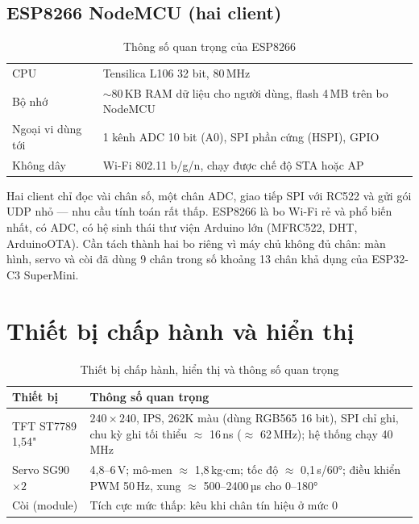 \subsection{ESP8266 NodeMCU (hai client)}
\begin{table}[H]
\centering\small
\caption{Thông số quan trọng của ESP8266}\label{tab:esp8266}
\begin{tabularx}{\linewidth}{@{}lX@{}}
\toprule
CPU & Tensilica L106 32 bit, 80\,MHz \\
Bộ nhớ & $\sim$80\,KB RAM dữ liệu cho người dùng, flash 4\,MB trên bo NodeMCU \\
Ngoại vi dùng tới & 1 kênh ADC 10 bit (A0), SPI phần cứng (HSPI), GPIO \\
Không dây & Wi-Fi 802.11 b/g/n, chạy được chế độ STA hoặc AP \\
\bottomrule
\end{tabularx}
\end{table}

\begin{lydo}
Hai client chỉ đọc vài chân số, một chân ADC, giao tiếp SPI với RC522 và gửi gói
UDP nhỏ — nhu cầu tính toán rất thấp. ESP8266 là bo Wi-Fi rẻ và phổ biến nhất, có
ADC, có hệ sinh thái thư viện Arduino lớn (MFRC522, DHT, ArduinoOTA). Cần tách thành hai
bo riêng vì máy chủ không đủ chân: màn hình, servo và còi đã dùng 9 chân trong số khoảng 13
chân khả dụng của ESP32-C3 SuperMini.
\end{lydo}

\section{Thiết bị chấp hành và hiển thị}
\begin{table}[H]
\centering\small
\caption{Thiết bị chấp hành, hiển thị và thông số quan trọng}\label{tab:actuators}
\begin{tabularx}{\linewidth}{@{}p{3.1cm}X@{}}
\toprule
\textbf{Thiết bị} & \textbf{Thông số quan trọng} \\ \midrule
TFT ST7789 1,54" & $240\times240$, IPS, 262K màu (dùng RGB565 16 bit), SPI chỉ ghi, chu kỳ ghi tối thiểu $\approx$ 16\,ns ($\approx$ 62\,MHz); hệ thống chạy 40\,MHz \\
Servo SG90 $\times2$ & 4,8–6\,V; mô-men $\approx$ 1,8\,kg$\cdot$cm; tốc độ $\approx$ 0,1\,s/60°; điều khiển PWM 50\,Hz, xung $\approx$ 500–2400\,µs cho 0–180° \\
Còi (module) & Tích cực mức thấp: kêu khi chân tín hiệu ở mức 0 \\
\bottomrule
\end{tabularx}
\end{table}

